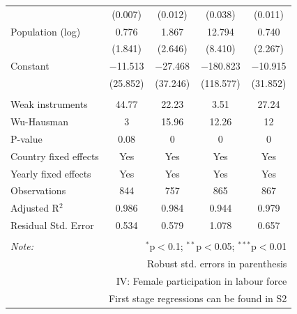 \documentclass[10pt,letterpaper]{article}
\begin{document}
\begin{table}[!htbp]
\begin{tabular}{@{\extracolsep{1pt}}lcccc}
  & (0.007) & (0.012) & (0.038) & (0.011) \\ 
  Population (log) & 0.776 & 1.867 & 12.794 & 0.740 \\ 
  & (1.841) & (2.646) & (8.410) & (2.267) \\ 
  Constant & $-$11.513 & $-$27.468 & $-$180.823 & $-$10.915 \\ 
  & (25.852) & (37.246) & (118.577) & (31.852) \\ 
 \hline \\[-1.8ex] 
Weak instruments & 44.77 & 22.23 & 3.51 & 27.24 \\ 
Wu-Hausman & 3 & 15.96 & 12.26 & 12 \\ 
P-value & 0.08 & 0 & 0 & 0 \\ 
Country fixed effects & Yes & Yes & Yes & Yes \\ 
Yearly fixed effects & Yes & Yes & Yes & Yes \\ 
Observations & 844 & 757 & 865 & 867 \\ 
Adjusted R$^{2}$ & 0.986 & 0.984 & 0.944 & 0.979 \\ 
Residual Std. Error & 0.534 & 0.579 & 1.078 & 0.657 \\ 
\hline 
\hline \\[-1.8ex] 
\textit{Note:}  & \multicolumn{4}{r}{$^{*}$p$<$0.1; $^{**}$p$<$0.05; $^{***}$p$<$0.01} \\ 
 & \multicolumn{4}{r}{Robust std. errors in parenthesis} \\ 
 & \multicolumn{4}{r}{IV: Female participation in labour force} \\ 
 & \multicolumn{4}{r}{First stage regressions can be found in S2} \\ 
\end{tabular} 
\end{table}
\end{document}
